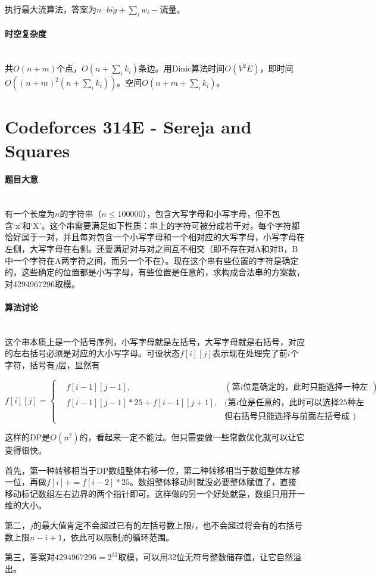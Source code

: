\documentclass[UTF8]{ctexart}
\newcommand{\myparagraph}[1]{\paragraph{#1}\mbox{}\\}
\theoremstyle{nonumberplain}
\begin{document}
			执行最大流算法，答案为$n \cdot big + \sum_i w_i - \mbox{流量}$。
		
		\myparagraph{时空复杂度}
		
			共$O(n+m)$个点，$O(n+\sum_i k_i)$条边。用Dinic算法时间$O(V^2E)$，即时间$O((n+m)^2(n+\sum_i k_i))$。空间$O(n+m+\sum_i k_i)$。
	
	\section{Codeforces 314E - Sereja and Squares}
	
		\myparagraph{题目大意}
		
			有一个长度为$n$的字符串（$n \leq 100000$），包含大写字母和小写字母，但不包含‘x’和‘X’。这个串需要满足如下性质：串上的字符可被分成若干对，每个字符都恰好属于一对，并且每对包含一个小写字母和一个相对应的大写字母，小写字母在左侧，大写字母在右侧。还要满足对与对之间互不相交（即不存在对A和对B，B中一个字符在A两字符之间，而另一个不在）。现在这个串有些位置的字符是确定的，这些确定的位置都是小写字母，有些位置是任意的，求构成合法串的方案数，对4294967296取模。
			
		\myparagraph{算法讨论}
		
			这个串本质上是一个括号序列，小写字母就是左括号，大写字母就是右括号，对应的左右括号必须是对应的大小写字母。可设状态$f[i][j]$表示现在处理完了前$i$个字符，括号有$j$层，显然有
			
			$$f[i][j]=\left\{\begin{aligned}
				&f[i-1][j-1], &(\mbox{第$i$位是确定的，此时只能选择一种左括号})\\
				&f[i-1][j-1]*25+f[i-1][j+1], &(\mbox{第$i$位是任意的，此时可以选择25种左括号，}\\
				&							 &\mbox{但右括号只能选择与前面左括号成对的一种})
			\end{aligned}\right.$$
			
			这样的DP是$O(n^2)$的，看起来一定不能过。但只需要做一些常数优化就可以让它变得很快。
			
			首先，第一种转移相当于DP数组整体右移一位，第二种转移相当于数组整体左移一位，再做$f[i]+=f[i-2]*25$。数组整体移动时就没必要整体赋值了，直接移动标记数组左右边界的两个指针即可。这样做的另一个好处就是，数组只用开一维的大小。
			
			第二，$j$的最大值肯定不会超过已有的左括号数上限$i$，也不会超过将会有的右括号数上限$n-i+1$，依此可以限制$j$的循环范围。
			
			第三，答案对$4294967296=2^{32}$取模，可以用32位无符号整数储存值，让它自然溢出。
			
\end{document}

